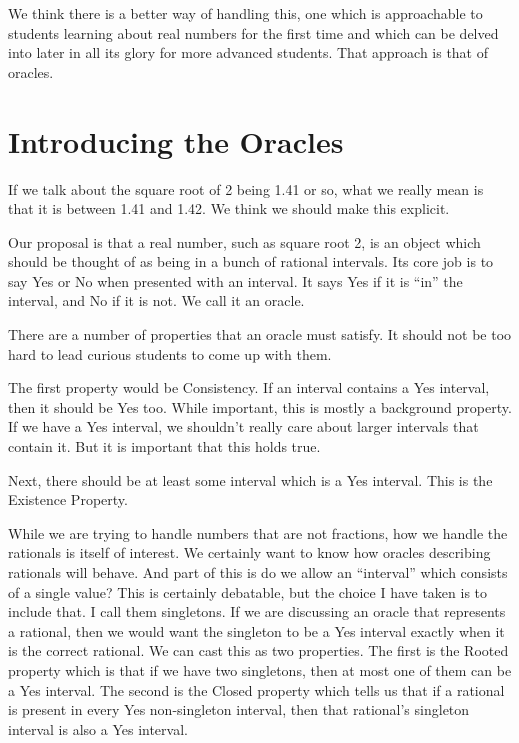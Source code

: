 \documentclass[12pt]{article}
\begin{document}
We think there is a better way of handling this, one which is approachable to students learning about real numbers for the first time and which can be delved into later in all its glory for more advanced students. That approach is that of oracles. 

\section{Introducing the Oracles}

If we talk about the square root of 2 being 1.41 or so, what we really mean is that it is between 1.41 and 1.42. We think we should make this explicit. 

Our proposal is that a real number, such as square root 2, is an object which should be thought of as being in a bunch of rational intervals. Its core job is to say Yes or No when presented with an interval. It says Yes if it is ``in'' the interval, and No if it is not. We call it an oracle. 

There are a number of properties that an oracle must satisfy. It should not be too hard to lead curious students to come up with them. 

The first property would be Consistency. If an interval contains a Yes interval, then it should be Yes too. While important, this is mostly a background property. If we have a Yes interval, we shouldn't really care about larger intervals that contain it. But it is important that this holds true. 

Next, there should be at least some interval which is a Yes interval. This is the Existence Property. 

While we are trying to handle numbers that are not fractions, how we handle the rationals is itself of interest. We certainly want to know how oracles describing rationals will behave. And part of this is do we allow an ``interval'' which consists of a single value? This is certainly debatable, but the choice I have taken is to include that. I call them singletons. If we are discussing an oracle that represents a rational, then we would want the singleton to be a Yes interval exactly when it is the correct rational. We can cast this as two properties. The first is the Rooted property which is that if we have two singletons, then at most one of them can be a Yes interval. The second is the Closed property which tells us that if a rational is present in every Yes non-singleton interval, then that rational's singleton interval is also a Yes interval. 
\end{document}
